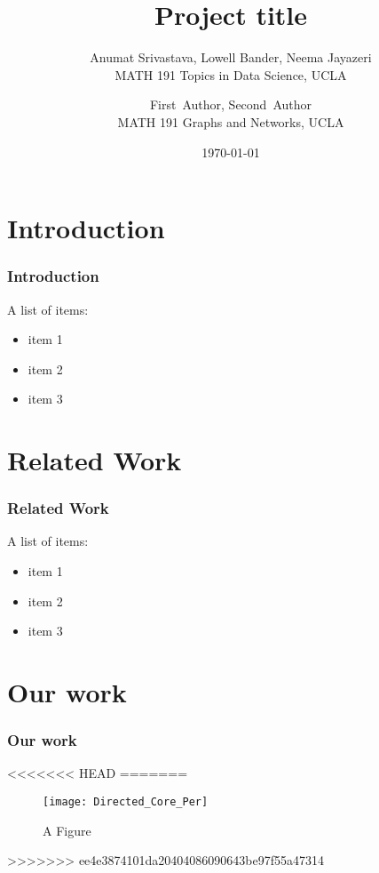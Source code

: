 \documentclass{beamer}
\title{Project title}
\author{ Anumat Srivastava, Lowell Bander, Neema Jayazeri\\
\vspace{5mm}
MATH 191 Topics in Data Science, UCLA}
\author{ First~Author, Second~Author\\
\vspace{5mm}
MATH 191 Graphs and Networks, UCLA}
\date{ \today}
\begin{document}
\newtheorem{theo}{Theorem}
\newtheorem{lem}{Lemma}
\newtheorem{defin}{Definition}
\newtheorem{prop}{Proposition}
\newtheorem{ex}{Example}
\newtheorem{alg}{Algorithm}
\newtheorem{cor}{Corollary}
\newtheorem{case}{Case}


\begin{frame}
  \titlepage
\end{frame}



\section{Introduction}

\begin{frame}
     \frametitle{Introduction}
A list of items:
\begin{itemize}
\item item 1
\item  item 2
\item  item 3
\end{itemize}
\end{frame}



\section{Related Work}

\begin{frame}
     \frametitle{Related Work}
A list of items:
\begin{itemize}
\item item 1
\item  item 2
\item  item 3
\end{itemize}
\end{frame}




 


\section{Our work}    \label{sec:ourWork}

\begin{frame}
     \frametitle{ Our work}
<<<<<<< HEAD
=======
\begin{figure}[h]
\begin{center}
\texttt{[image: Directed\_Core\_Per]}
\end{center}
\caption{A Figure}
\label{fig:DirCorPer}
\end{figure}

>>>>>>> ee4e3874101da20404086090643be97f55a47314
\end{frame}
\end{document}

